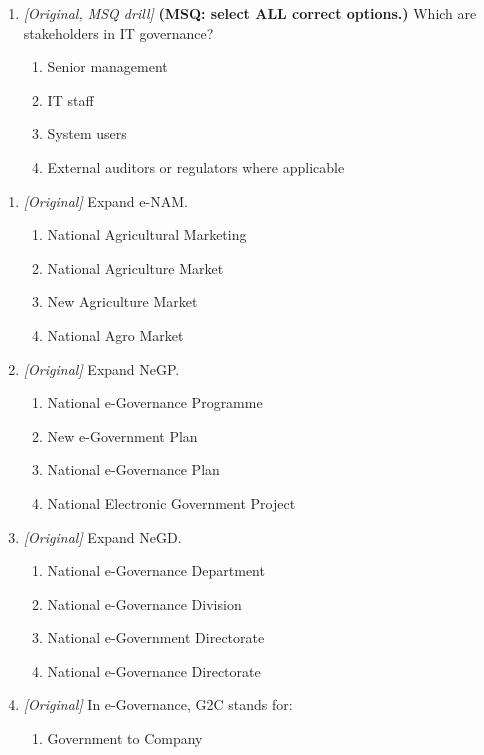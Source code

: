 \begin{enumerate}[label=\textbf{Q\arabic*.}, leftmargin=*]
\item \textit{[Original, MSQ drill]} \textbf{(MSQ: select ALL correct options.)} Which are stakeholders in IT governance?
  \begin{enumerate}[label=\Alph*.]
\item Senior management
   \item IT staff
   \item System users
   \item External auditors or regulators where applicable
  \end{enumerate}

\end{enumerate}
\begin{enumerate}[label=\textbf{Q\arabic*.}, leftmargin=*]
\item \textit{[Original]} Expand e-NAM.
  \begin{enumerate}[label=\Alph*.]
    \item National Agricultural Marketing
    \item National Agriculture Market
    \item New Agriculture Market
    \item National Agro Market
  \end{enumerate}
\item \textit{[Original]} Expand NeGP.
  \begin{enumerate}[label=\Alph*.]
    \item National e-Governance Programme
    \item New e-Government Plan
    \item National e-Governance Plan
    \item National Electronic Government Project
  \end{enumerate}
\item \textit{[Original]} Expand NeGD.
  \begin{enumerate}[label=\Alph*.]
    \item National e-Governance Department
    \item National e-Governance Division
    \item National e-Government Directorate
    \item National e-Governance Directorate
  \end{enumerate}
\item \textit{[Original]} In e-Governance, G2C stands for:
  \begin{enumerate}[label=\Alph*.]
    \item Government to Company

\end{enumerate}
\end{enumerate}
